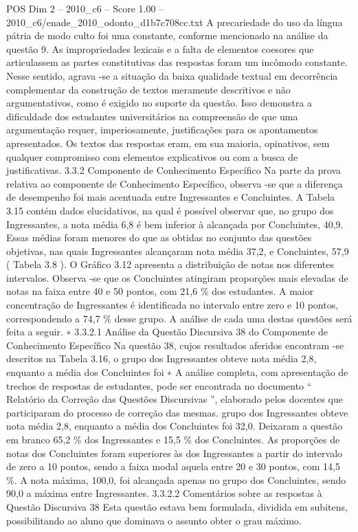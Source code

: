 \begin{textsample}{POS Dim 2 – 2010\_c6 – Score 1.00 – 2010\_c6/enade\_2010\_odonto\_d1b7c708cc.txt}
A precariedade do uso da língua pátria de modo culto foi uma constante, conforme mencionado na análise da questão 9.
As impropriedades lexicais e a falta de elementos coesores que articulassem as partes constitutivas das respostas foram um incômodo constante.
Nesse sentido, agrava -se a situação da baixa qualidade textual em decorrência complementar da construção de textos meramente descritivos e não argumentativos, como é exigido no suporte da questão.
Isso demonstra a dificuldade dos estudantes universitários na compreensão de que uma argumentação requer, imperiosamente, justificações para os apontamentos apresentados.
Os textos das respostas eram, em sua maioria, opinativos, sem qualquer compromisso com elementos explicativos ou com a busca de justificativas. 3.3.2 Componente de Conhecimento Específico Na parte da prova relativa ao componente de Conhecimento Específico, observa -se que a diferença de desempenho foi mais acentuada entre Ingressantes e Concluintes.
A Tabela 3.15 contém dados elucidativos, na qual é possível observar que, no grupo dos Ingressantes, a nota média 6,8 é bem inferior à alcançada por Concluintes, 40,9.
Essas médias foram menores do que as obtidas no conjunto das questões objetivas, nas quais Ingressantes alcançaram nota média 37,2, e Concluintes, 57,9 ( Tabela 3.8 ).
O Gráfico 3.12 apresenta a distribuição de notas nos diferentes intervalos.
Observa -se que os Concluintes atingiram proporções mais elevadas de notas na faixa entre 40 e 50 pontos, com 21,6 \% dos estudantes.
A maior concentração de Ingressantes é identificada no intervalo entre zero e 10 pontos, correspondendo a 74,7 \% desse grupo.
A análise de cada uma destas questões será feita a seguir. ∗ 3.3.2.1 Análise da Questão Discursiva 38 do Componente de Conhecimento Específico Na questão 38, cujos resultados aferidos encontram -se descritos na Tabela 3.16, o grupo dos Ingressantes obteve nota média 2,8, enquanto a média dos Concluintes foi ∗ A análise completa, com apresentação de trechos de respostas de estudantes, pode ser encontrada no documento “ Relatório da Correção das Questões Discursivas ”, elaborado pelos docentes que participaram do processo de correção das mesmas. grupo dos Ingressantes obteve nota média 2,8, enquanto a média dos Concluintes foi 32,0.
Deixaram a questão em branco 65,2 \% dos Ingressantes e 15,5 \% dos Concluintes.
As proporções de notas dos Concluintes foram superiores às dos Ingressantes a partir do intervalo de zero a 10 pontos, sendo a faixa modal aquela entre 20 e 30 pontos, com 14,5 \%.
A nota máxima, 100,0, foi alcançada apenas no grupo dos Concluintes, sendo 90,0 a máxima entre Ingressantes. 3.3.2.2 Comentários sobre as respostas à Questão Discursiva 38 Esta questão estava bem formulada, dividida em subitens, possibilitando ao aluno que dominava o assunto obter o grau máximo.

\end{textsample}

